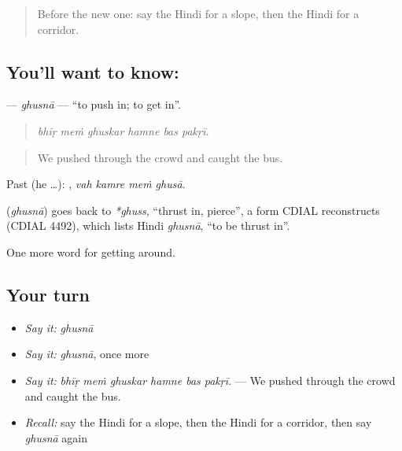 \label{lesson:HI-C420-ghusna}



\begin{quote}
Before the new one: say the Hindi for a slope, then the Hindi for a corridor.
\end{quote}

\subsection*{You'll want to know: }
\textbf{} — \emph{ghusnā} — \textquotedblleft{}to push in; to get in\textquotedblright{}.

\begin{quote}
     
\end{quote}

\begin{quote}
\emph{bhīṛ meṁ ghuskar hamne bas pakṛī.}
\end{quote}

\begin{quote}
We pushed through the crowd and caught the bus.
\end{quote}

Past (he …):    , \emph{vah kamre meṁ ghusā}.

\begin{cousinweb}
\textbf{} (\emph{ghusnā}) goes back to \emph{*ghuss}, \textquotedblleft{}thrust in, pierce\textquotedblright{}, a form CDIAL reconstructs (CDIAL 4492), which lists Hindi \emph{ghusnā}, \textquotedblleft{}to be thrust in\textquotedblright{}.
\end{cousinweb}

\begin{grammarlens}[title={What you've built}]
One more word for getting around.
\end{grammarlens}

\subsection*{Your turn}
\begin{itemize}
\raggedright
  \item \emph{Say it:} \emph{ghusnā}
  \item \emph{Say it:} \emph{ghusnā}, once more
  \item \emph{Say it:} \emph{bhīṛ meṁ ghuskar hamne bas pakṛī.} — We pushed through the crowd and caught the bus.
  \item \emph{Recall:} say the Hindi for a slope, then the Hindi for a corridor, then say \emph{ghusnā} again
\end{itemize}

